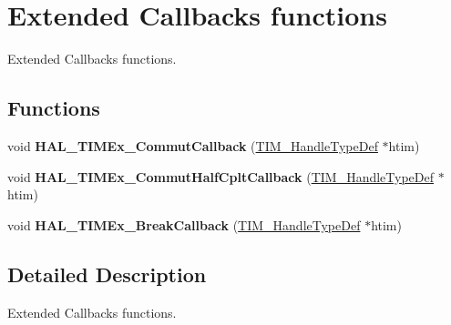 \hypertarget{group___t_i_m_ex___exported___functions___group6}{}\section{Extended Callbacks functions}
\label{group___t_i_m_ex___exported___functions___group6}


Extended Callbacks functions.  


\subsection*{Functions}
\begin{DoxyCompactItemize}
\item 
\mbox{\label{group___t_i_m_ex___exported___functions___group6_gaa4189b31d2c006ee33f55f8c6eeba930}} 
void {\bfseries H\+A\+L\+\_\+\+T\+I\+M\+Ex\+\_\+\+Commut\+Callback} (\hyperlink{struct_t_i_m___handle_type_def}{T\+I\+M\+\_\+\+Handle\+Type\+Def} $\ast$htim)
\item 
\mbox{\label{group___t_i_m_ex___exported___functions___group6_ga971ecdc215921771e56ed2c4944dc0b1}} 
void {\bfseries H\+A\+L\+\_\+\+T\+I\+M\+Ex\+\_\+\+Commut\+Half\+Cplt\+Callback} (\hyperlink{struct_t_i_m___handle_type_def}{T\+I\+M\+\_\+\+Handle\+Type\+Def} $\ast$htim)
\item 
\mbox{\label{group___t_i_m_ex___exported___functions___group6_ga2d868a55ca7c62c4a5ef85dec514402c}} 
void {\bfseries H\+A\+L\+\_\+\+T\+I\+M\+Ex\+\_\+\+Break\+Callback} (\hyperlink{struct_t_i_m___handle_type_def}{T\+I\+M\+\_\+\+Handle\+Type\+Def} $\ast$htim)
\end{DoxyCompactItemize}


\subsection{Detailed Description}
Extended Callbacks functions. 

